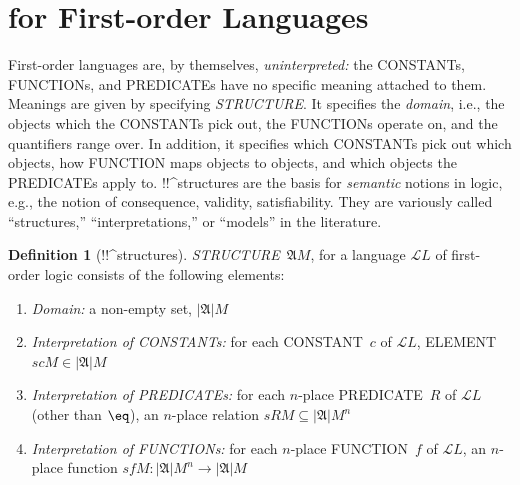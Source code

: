 \documentclass[10pt,a4paper]{article}
\newcommand*{\olup}[1]{\MakeUppercase{#1}}
\theoremstyle{plain}
\theoremstyle{definition}
\newtheorem{defn}[thm]{Definition}
\theoremstyle{remark}
\newenvironment{explain}{}{}
\newcommand*{\olfileid}[3]{}
\newcommand*{\olsection}[1]{\section*{#1}}
\newcommand*{\olchapter}[3]{}
\newcommand*{\olimport}[1]{}
\providecommand{\Struct}{\ensuremath{\mathfrak{A}}}
\providecommand{\Domain}{\ensuremath{|\mathfrak{A}|}}
\providecommand{\Assign}{\ensuremath{s}}
\providecommand{\Lang}{\ensuremath{\mathcal{L}}}
\begin{document}



\olchapter{fol}{sem}{Semantics of First-Order Logic}

\olimport{intro-semantics}

\olimport{structures}

\olimport{covered-structures}

\olimport{satisfaction}

\olimport{assignments}

\olimport{extensionality}

\olimport{semantic-notions}

\OLEndChapterHook





\olfileid{fol}{syn}{str}

\olsection{ for First-order Languages}

\begin{explain}
First-order languages are, by themselves, \emph{uninterpreted:} the
\olup{constant}s, \olup{function}s, and \olup{predicate}s have no specific
meaning attached to them.  Meanings are given by specifying
 \emph{\olup{structure}}. It specifies the
\emph{domain}, i.e., the objects which the \olup{constant}s pick out, the
\olup{function}s operate on, and the quantifiers range over. In addition,
it specifies which \olup{constant}s pick out which objects, how
\olup{function} maps objects to objects, and which objects the
\olup{predicate}s apply to.  !!^{structure}s are the basis for
\emph{semantic} notions in logic, e.g., the notion of consequence,
validity, satisfiability. They are variously called ``structures,''
``interpretations,'' or ``models'' in the literature.
\end{explain}

\begin{defn}[!!^{structure}s]
 \emph{\olup{structure}}~$\Struct M$, for a language
$\Lang{L}$ of first-order logic consists of the following elements:
\begin{enumerate}
\item \emph{Domain:} a non-empty set, $\Domain M$
\item \emph{Interpretation of \olup{constant}s:} for each \olup{constant}~$c$ of
  $\Lang{L}$, \olup{element} $\Assign{c}{M} \in \Domain M$
\item \emph{Interpretation of \olup{predicate}s:} for each $n$-place
  \olup{predicate}~$R$ of $\Lang{L}$ (other than $\eq$), an $n$-place
  relation $\Assign{R}{M} \subseteq \Domain{M}^n$
\item \emph{Interpretation of \olup{function}s:} for each $n$-place
  \olup{function}~$f$ of $\Lang{L}$, an $n$-place function $\Assign{f}{M}
  \colon \Domain{M}^n \to \Domain{M}$
\end{enumerate}
\end{defn}
\end{document}
